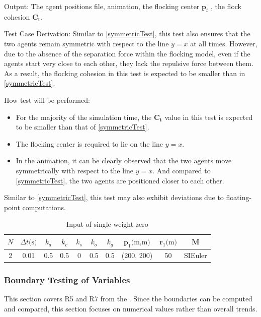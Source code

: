 \documentclass[12pt, titlepage]{article}
\begin{document}
\begin{enumerate}
Output: The agent positions file, animation, the flocking center $\mathbf{p}_t$ , the flock 
cohesion $\mathbf{C}_\mathbf{t}$.

Test Case Derivation: Similar to \ref{symmetricTest}, this test also ensures 
that the two agents remain symmetric with respect to the line $y=x$ at all 
times. However, due to the absence of the separation force within the 
flocking model, even if the agents start very close to each other, they lack 
the repulsive force between them. As a result, the flocking cohesion in this 
test is expected to be smaller than in \ref{symmetricTest}.

How test will be performed: 
\begin{itemize}
\item For the majority of the simulation time, the $\mathbf{C}_\mathbf{t}$ 
value in this test is expected to be smaller than that of \ref{symmetricTest}.
\item The flocking center is required to lie on the line $y=x$.
\item In the animation, it can be clearly observed that the two agents move 
symmetrically with respect to the line $y=x$. And compared to \ref{symmetricTest}, 
the two agents are positioned closer to each other.
\end{itemize}
Similar to \ref{symmetricTest}, this test may also exhibit deviations due to 
floating-point computations.

\begin{longtable}{c c c c c c c c c c}
\caption{Input of single-weight-zero} \label{TblMotionTest2} \\
\hline
$N$ & ${\Delta t}\text{(s)}$ & $k_a$ & $k_c$ & $k_s$ & $k_o$ & $k_g$ & $\mathbf{p}_1\text{(m,m)}$ & $\mathbf{r}_1\text{(m)}$ & $\mathbf{M}$ \\
\hline
2 & 0.01 & 0.5 & 0.5 & 0 & 0.5 & 0.5 & (200, 200) & 50 & SIEuler \\
\hline
\end{longtable}

\end{enumerate}

\subsubsection{Boundary Testing of Variables} \label{boundaryTest}

This section covers R5 and R7 from the \citet{SRS}. Since the boundaries 
can be computed and compared, this section focuses on numerical values 
rather than overall trends.
\end{document}

